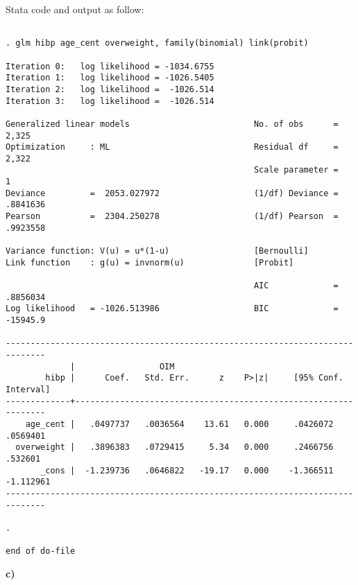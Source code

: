 \documentclass{article}
\begin{document}
Stata code and output as follow:
\begin{verbatim}

. glm hibp age_cent overweight, family(binomial) link(probit)

Iteration 0:   log likelihood = -1034.6755  
Iteration 1:   log likelihood = -1026.5405  
Iteration 2:   log likelihood =  -1026.514  
Iteration 3:   log likelihood =  -1026.514  

Generalized linear models                         No. of obs      =      2,325
Optimization     : ML                             Residual df     =      2,322
                                                  Scale parameter =          1
Deviance         =  2053.027972                   (1/df) Deviance =   .8841636
Pearson          =  2304.250278                   (1/df) Pearson  =   .9923558

Variance function: V(u) = u*(1-u)                 [Bernoulli]
Link function    : g(u) = invnorm(u)              [Probit]

                                                  AIC             =   .8856034
Log likelihood   = -1026.513986                   BIC             =   -15945.9

------------------------------------------------------------------------------
             |                 OIM
        hibp |      Coef.   Std. Err.      z    P>|z|     [95% Conf. Interval]
-------------+----------------------------------------------------------------
    age_cent |   .0497737   .0036564    13.61   0.000     .0426072    .0569401
  overweight |   .3896383   .0729415     5.34   0.000     .2466756     .532601
       _cons |  -1.239736   .0646822   -19.17   0.000    -1.366511   -1.112961
------------------------------------------------------------------------------

. 

end of do-file

\end{verbatim}

\textbf{c)}
\end{document}
